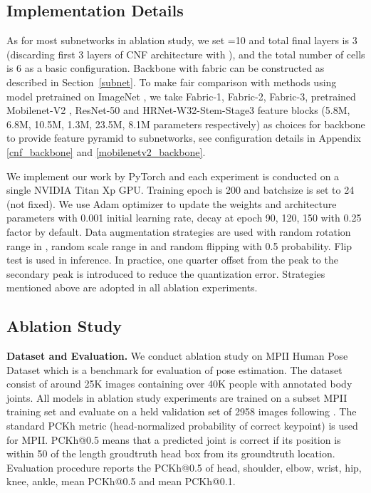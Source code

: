\documentclass[journal]{IEEEtran}
\begin{document}
\subsection{Implementation Details}
\label{implement}

As for most subnetworks in ablation study, we set =10 and total final layers is 3 (discarding first 3 layers of CNF architecture with ), and the total number of cells is 6 as a basic configuration. Backbone with fabric can be constructed as described in Section~\ref{subnet}. To make fair comparison with methods using model pretrained on ImageNet \cite{russakovsky2015imagenet}, we take Fabric-1, Fabric-2, Fabric-3, pretrained Mobilenet-V2 \cite{Sandler2018MobileNetV2IR}, ResNet-50 \cite{he2016deep} and HRNet-W32-Stem-Stage3 \cite{Sun_2019_CVPR} feature blocks (5.8M, 6.8M, 10.5M, 1.3M, 23.5M, 8.1M parameters respectively) as choices for backbone to provide feature pyramid to subnetworks, see configuration details in Appendix \ref{cnf_backbone} and \ref{mobilenetv2_backbone}. 



We implement our work by PyTorch \cite{paszke2017automatic} and each experiment is conducted on a single NVIDIA Titan Xp GPU. Training epoch is 200 and batchsize is set to 24 (not fixed). We use Adam \cite{kingma2014adam} optimizer to update the weights and architecture parameters with 0.001 initial learning rate, decay at epoch 90, 120, 150 with 0.25 factor by default. Data augmentation strategies are used with random rotation range in , random scale range in  and random flipping with 0.5 probability. Flip test is used in inference. In practice, one quarter offset from the peak to the secondary peak is introduced to reduce the quantization error. Strategies mentioned above are adopted in all ablation experiments. 

\subsection{Ablation Study}


\label{ablation}




\textbf{Dataset and Evaluation.} We conduct ablation study on MPII Human Pose Dataset \cite{andriluka20142d} which is a benchmark for evaluation of pose estimation. The dataset consist of around 25K images containing over 40K people with annotated body joints. All models in ablation study experiments are trained on a subset MPII training set and evaluate on a held validation set of 2958 images following \cite{xiao2018simple}. The standard PCKh metric (head-normalized probability of correct keypoint) is used for MPII. PCKh@0.5 means that a predicted joint is correct if its position is within 50 of the length groudtruth head box from its groundtruth location. Evaluation procedure reports the PCKh@0.5 of head, shoulder, elbow, wrist, hip, knee, ankle, mean PCKh@0.5 and mean PCKh@0.1.  
\end{document}
